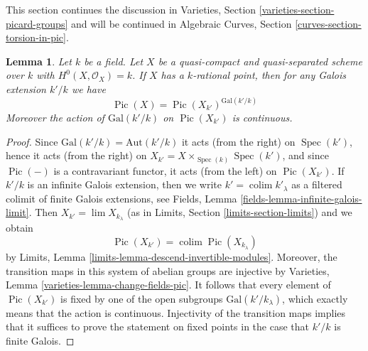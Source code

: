 \documentclass{stacks-project}
\theoremstyle{plain}
\newtheorem{lemma}[subsection]{Lemma}
\theoremstyle{definition}
\theoremstyle{remark}
\numberwithin{equation}{subsection}
\def\lim{\mathop{\mathrm{lim}}\nolimits}
\def\colim{\mathop{\mathrm{colim}}\nolimits}
\def\Spec{\mathop{\mathrm{Spec}}}
\def\Pic{\mathop{\mathrm{Pic}}\nolimits}
\begin{document}
\noindent
This section continues the discussion in
Varieties, Section \ref{varieties-section-picard-groups}
and will be continued in
Algebraic Curves, Section \ref{curves-section-torsion-in-pic}.

\begin{lemma}
\label{lemma-pic-descends}
Let $k$ be a field. Let $X$ be a quasi-compact and quasi-separated scheme
over $k$ with $H^0(X, \mathcal{O}_X) = k$. If $X$ has a $k$-rational point,
then for any Galois extension $k'/k$ we have
$$
\Pic(X) = \Pic(X_{k'})^{\text{Gal}(k'/k)}
$$
Moreover the action of $\text{Gal}(k'/k)$ on $\Pic(X_{k'})$
is continuous.
\end{lemma}

\begin{proof}
Since $\text{Gal}(k'/k) = \text{Aut}(k'/k)$ it acts (from the right)
on $\Spec(k')$, hence it acts (from the right) on
$X_{k'} = X \times_{\Spec(k)} \Spec(k')$, and since $\Pic(-)$
is a contravariant functor, it acts (from the left) on $\Pic(X_{k'})$.
If $k'/k$ is an infinite Galois extension, then we write
$k' = \colim k'_\lambda$ as a filtered colimit of finite Galois
extensions, see Fields, Lemma \ref{fields-lemma-infinite-galois-limit}.
Then $X_{k'} = \lim X_{k_\lambda}$
(as in Limits, Section \ref{limits-section-limits})
and we obtain
$$
\Pic(X_{k'}) = \colim \Pic(X_{k_\lambda})
$$
by Limits, Lemma \ref{limits-lemma-descend-invertible-modules}.
Moreover, the transition maps in this system of abelian groups
are injective by Varieties, Lemma \ref{varieties-lemma-change-fields-pic}.
It follows that every element of $\Pic(X_{k'})$ is fixed by
one of the open subgroups $\text{Gal}(k'/k_\lambda)$, which exactly
means that the action is continuous. Injectivity of the transition maps
implies that it suffices to prove the statement on fixed points in the
case that $k'/k$ is finite Galois.


\end{proof}
\end{document}
